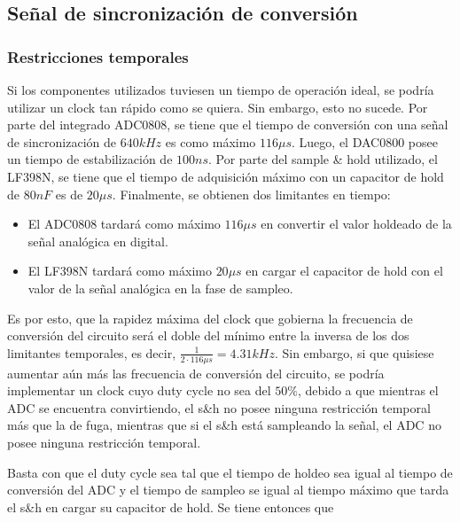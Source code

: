 \subsection{Señal de sincronización de conversión}

\subsubsection{Restricciones temporales}

Si los componentes utilizados tuviesen un tiempo de operación ideal, se podría utilizar un clock tan rápido como se quiera. Sin embargo, esto no sucede. Por parte del integrado ADC0808, se tiene que el tiempo de conversión con una señal de sincronización de $640kHz$ es como máximo $116\mu s$. Luego, el DAC0800 posee un tiempo de estabilización de $100ns$. Por parte del sample \& hold utilizado, el LF398N, se tiene que el tiempo de adquisición máximo con un capacitor de hold de $80 nF$ es de $20\mu s$. Finalmente, se obtienen dos limitantes en tiempo: 

\begin{itemize}
\item El ADC0808 tardará como máximo $116\mu s$ en convertir el valor holdeado de la señal analógica en digital.
\item El LF398N tardará como máximo $20\mu s$ en cargar el capacitor de hold con el valor de la señal analógica en la fase de sampleo.
\end{itemize}

Es por esto, que la rapidez máxima del clock que gobierna la frecuencia de conversión del circuito será el doble del mínimo entre la inversa de los dos limitantes temporales, es decir, $\frac{1}{2\cdot 116\mu s} = 4.31kHz$. Sin embargo, si que quisiese aumentar aún más las frecuencia de conversión del circuito, se podría implementar un clock cuyo duty cycle no sea del $50\%$, debido a que mientras el ADC se encuentra convirtiendo, el s\&h no posee ninguna restricción temporal más que la de fuga, mientras que si el s\&h está sampleando la señal, el ADC no posee ninguna restricción temporal.


Basta con que el duty cycle sea tal que el tiempo de holdeo sea igual al tiempo de conversión del ADC y el tiempo de sampleo se igual al tiempo máximo que tarda el s\&h en cargar su capacitor de hold. Se tiene entonces que

